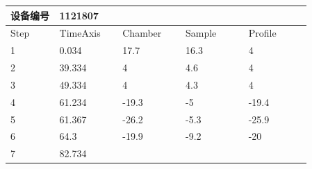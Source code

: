 \documentclass[UTF8,10pt,a4paper,fontset=fandol]{ctexart}
\newcommand{\fieldvalue}[1]{#1}
\begin{document}
\begin{center}
\begin{tabular}{|p{0.14\linewidth}|p{0.18\linewidth}|p{0.18\linewidth}|p{0.18\linewidth}|p{0.18\linewidth}|}
\hline
设备编号 &
\fieldvalue{1121807} &
\multicolumn{3}{c|}{}\\
\hline
Step & TimeAxis & Chamber & Sample & Profile\\
\hline
1 &
\fieldvalue{0.034} &
\fieldvalue{17.7} &
\fieldvalue{16.3} &
\fieldvalue{4}\\
\hline
2 &
\fieldvalue{39.334} &
\fieldvalue{4} &
\fieldvalue{4.6} &
\fieldvalue{4}\\
\hline
3 &
\fieldvalue{49.334} &
\fieldvalue{4} &
\fieldvalue{4.3} &
\fieldvalue{4}\\
\hline
4 &
\fieldvalue{61.234} &
\fieldvalue{-19.3} &
\fieldvalue{-5} &
\fieldvalue{-19.4}\\
\hline
5 &
\fieldvalue{61.367} &
\fieldvalue{-26.2} &
\fieldvalue{-5.3} &
\fieldvalue{-25.9}\\
\hline
6 &
\fieldvalue{64.3} &
\fieldvalue{-19.9} &
\fieldvalue{-9.2} &
\fieldvalue{-20}\\
\hline
7 &
\fieldvalue{82.734} &

\end{tabular}
\end{center}
\end{document}
